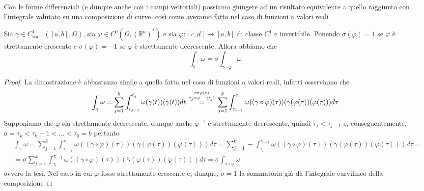 Con le forme differenziali (e dunque anche con i campi vettoriali) possiamo giungere ad un risultato equivalente a quello raggiunto
con l'integrale valutato su una composizione di curve, così come avevamo fatto nel caso di funzioni a valori reali
\begin{theorem}[di invarianza]
	Sia $\gamma \in C^1_{\text{tratti}}([a, b], \Omega)$, sia $\omega \in C^0(\Omega, (\mathbb{R}^n)^*)$ e sia $\varphi: [c, d] \to [a, b]$
	di classe $C^1$ e invertibile. Ponendo $\sigma(\varphi)= 1$ se $\varphi$ è strettamente crescente e $\sigma(\varphi)=-1$ se $\varphi$ è strettamente decrescente.
	Allora abbiamo che
	$$
		\int_\gamma \omega = \sigma \int_{\gamma \circ \varphi} \omega
	$$
	\label{thm:teo_di_invarianza}
\end{theorem}
\begin{proof}
La dimostrazione è abbastanza simile a quella fatta nel caso di funzioni a valori reali, infatti osserviamo che
$$
\int_{\gamma} \omega = \sum_{j=1}^k \int_{t_{j-1}}^{t_j} \omega(\gamma(t))(\dot{\gamma}(t))dt \stackrel{t=\varphi(\tau) \atop \tau_j = \varphi^{-1}(t_j)}{=} \sum_{j=1}^k \int_{\tau_{i-1}}^{\tau_{i}} \omega((\gamma \circ \varphi)(\tau))(\dot{\gamma}(\varphi(\tau))(\dot{\varphi}(\tau)))d\tau
$$
Supponiamo che $\varphi$ sia strettamente decrescente, dunque anche $\varphi^{-1}$ è strettamente decrescente, quindi $\tau_j < \tau_{j-1}$ e, conseguentemente, $a = \tau_k < \tau_k-1 < \ldots < \tau_0 = b$ pertanto
\begin{align*}
&\int_\gamma \omega = \sum_{j=1}^k \int_{\tau_{i-1}}^{\tau_{i}} \omega((\gamma \circ \varphi)(\tau))(\dot{\gamma}(\varphi(\tau))(\dot{\varphi}(\tau)))d\tau = \sum_{j=1}^k - \int_{\tau_{i}}^{\tau_{i-1}} \omega((\gamma \circ \varphi)(\tau))(\dot{\gamma}(\varphi(\tau))(\dot{\varphi}(\tau)))d\tau = \\
&= \sigma \sum_{j=1}^k \int_{\tau_{i}}^{\tau_{i-1}} \omega((\gamma \circ \varphi)(\tau))(\dot{\gamma}(\varphi(\tau))(\dot{\varphi}(\tau)))d\tau = \sigma \int_{\gamma \circ \varphi} \omega
\end{align*}
ovvero la tesi. Nel caso in cui $\varphi$ fosse strettamente crescente e, dunque, $\sigma=1$ la sommatoria già dà l'integrale curvilineo della composizione
\end{proof}

